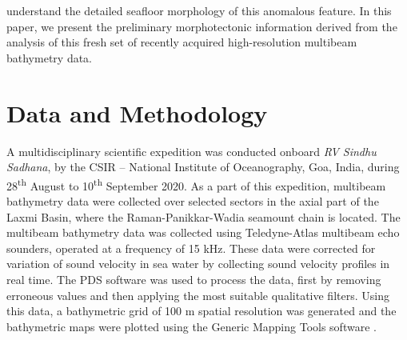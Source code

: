 \documentclass[twocolumn]{article}
\begin{document}
understand the detailed seafloor morphology of this anomalous feature. In this paper, we present the preliminary morphotectonic information derived from the analysis of this fresh set of recently acquired high-resolution multibeam bathymetry data.
\section{Data and Methodology}
A multidisciplinary scientific expedition was conducted onboard \textit{RV Sindhu Sadhana}, by the CSIR – National Institute of Oceanography, Goa, India, during 28\textsuperscript{th} August to 10\textsuperscript{th} September 2020. As a part of this expedition, multibeam bathymetry data were collected over selected sectors in the axial part of the Laxmi Basin, where the Raman-Panikkar-Wadia seamount chain is located. The multibeam bathymetry data was collected using Teledyne-Atlas multibeam echo sounders, operated at a frequency of 15 kHz. These data were corrected for variation of sound velocity in sea water by collecting sound velocity profiles in real time. The PDS software was used to process the data, first by removing erroneous values and then applying the most suitable qualitative filters. Using this data, a bathymetric grid of 100 m spatial resolution was generated and the bathymetric maps were plotted using the Generic Mapping Tools software \citep{Wessel2019}.
\end{document}
